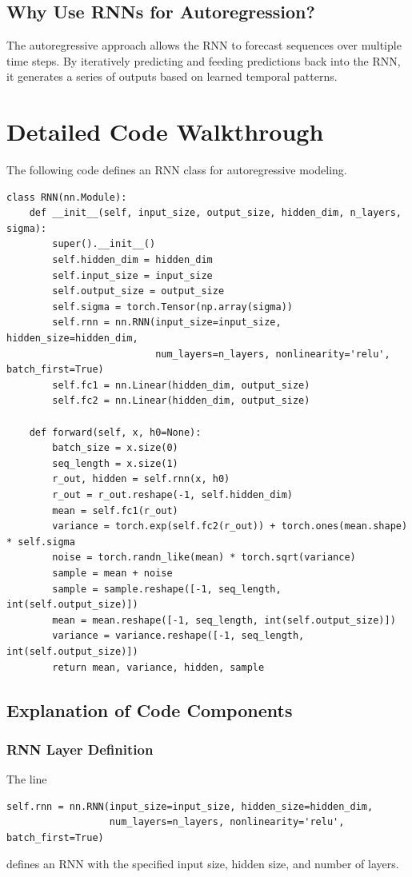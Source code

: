 \documentclass{article}
\begin{document}
\subsection{Why Use RNNs for Autoregression?}
The autoregressive approach allows the RNN to forecast sequences over multiple time steps. By iteratively predicting and feeding predictions back into the RNN, it generates a series of outputs based on learned temporal patterns.

\section{Detailed Code Walkthrough}

The following code defines an RNN class for autoregressive modeling.

\begin{verbatim}
class RNN(nn.Module):
    def __init__(self, input_size, output_size, hidden_dim, n_layers, sigma):
        super().__init__()
        self.hidden_dim = hidden_dim
        self.input_size = input_size
        self.output_size = output_size
        self.sigma = torch.Tensor(np.array(sigma))
        self.rnn = nn.RNN(input_size=input_size, hidden_size=hidden_dim, 
                          num_layers=n_layers, nonlinearity='relu', batch_first=True)
        self.fc1 = nn.Linear(hidden_dim, output_size)
        self.fc2 = nn.Linear(hidden_dim, output_size)

    def forward(self, x, h0=None):
        batch_size = x.size(0)
        seq_length = x.size(1)
        r_out, hidden = self.rnn(x, h0)
        r_out = r_out.reshape(-1, self.hidden_dim)
        mean = self.fc1(r_out)
        variance = torch.exp(self.fc2(r_out)) + torch.ones(mean.shape) * self.sigma
        noise = torch.randn_like(mean) * torch.sqrt(variance)
        sample = mean + noise
        sample = sample.reshape([-1, seq_length, int(self.output_size)])
        mean = mean.reshape([-1, seq_length, int(self.output_size)])
        variance = variance.reshape([-1, seq_length, int(self.output_size)])
        return mean, variance, hidden, sample
\end{verbatim}

\subsection{Explanation of Code Components}

\subsubsection{RNN Layer Definition}
The line
\begin{verbatim}
self.rnn = nn.RNN(input_size=input_size, hidden_size=hidden_dim, 
                  num_layers=n_layers, nonlinearity='relu', batch_first=True)
\end{verbatim}
defines an RNN with the specified input size, hidden size, and number of layers.
\end{document}
